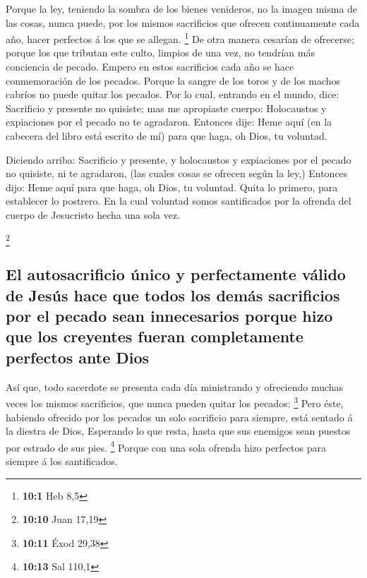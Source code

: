  Porque la ley, teniendo la sombra de los bienes venideros,
no la imagen misma de las cosas, nunca puede, por los mismos sacrificios
que ofrecen continuamente cada año, hacer perfectos á los que se
allegan. \footnote{\textbf{10:1} Heb 8,5}  De otra manera
cesarían de ofrecerse; porque los que tributan este culto, limpios de
una vez, no tendrían más conciencia de pecado.  Empero en
estos sacrificios cada año se hace conmemoración de los pecados.
 Porque la sangre de los toros y de los machos cabríos no
puede quitar los pecados.  Por lo cual, entrando en el
mundo, dice: Sacrificio y presente no quisiste; mas me apropiaste
cuerpo:  Holocaustos y expiaciones por el pecado no te
agradaron.  Entonces dije: Heme aquí (en la cabecera del
libro está escrito de mí) para que haga, oh Dios, tu voluntad.

 Diciendo arriba: Sacrificio y presente, y holocaustos y
expiaciones por el pecado no quisiste, ni te agradaron, (las cuales
cosas se ofrecen según la ley,)  Entonces dijo: Heme aquí
para que haga, oh Dios, tu voluntad. Quita lo primero, para establecer
lo postrero.  En la cual voluntad somos santificados por la
ofrenda del cuerpo de Jesucristo hecha una sola vez.

\footnote{\textbf{10:10} Juan 17,19}

\hypertarget{el-autosacrificio-uxfanico-y-perfectamente-vuxe1lido-de-jesuxfas-hace-que-todos-los-demuxe1s-sacrificios-por-el-pecado-sean-innecesarios-porque-hizo-que-los-creyentes-fueran-completamente-perfectos-ante-dios}{%
\subsection{El autosacrificio único y perfectamente válido de Jesús hace
que todos los demás sacrificios por el pecado sean innecesarios porque
hizo que los creyentes fueran completamente perfectos ante
Dios}\label{el-autosacrificio-uxfanico-y-perfectamente-vuxe1lido-de-jesuxfas-hace-que-todos-los-demuxe1s-sacrificios-por-el-pecado-sean-innecesarios-porque-hizo-que-los-creyentes-fueran-completamente-perfectos-ante-dios}}

 Así que, todo sacerdote se presenta cada día ministrando y
ofreciendo muchas veces los mismos sacrificios, que nunca pueden quitar
los pecados: \footnote{\textbf{10:11} Éxod 29,38}  Pero
éste, habiendo ofrecido por los pecados un solo sacrificio para siempre,
está sentado á la diestra de Dios,  Esperando lo que resta,
hasta que sus enemigos sean puestos por estrado de sus pies. \footnote{\textbf{10:13}
  Sal 110,1}  Porque con una sola ofrenda hizo perfectos
para siempre á los santificados.

